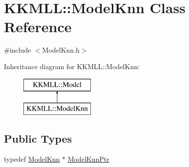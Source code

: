 \hypertarget{class_k_k_m_l_l_1_1_model_knn}{}\section{K\+K\+M\+LL\+:\+:Model\+Knn Class Reference}
\label{class_k_k_m_l_l_1_1_model_knn}


{\ttfamily \#include $<$Model\+Knn.\+h$>$}

Inheritance diagram for K\+K\+M\+LL\+:\+:Model\+Knn\+:\begin{figure}[H]
\begin{center}
\leavevmode
\includegraphics[height=2.000000cm]{class_k_k_m_l_l_1_1_model_knn}
\end{center}
\end{figure}
\subsection*{Public Types}
\begin{DoxyCompactItemize}
\item 
typedef \hyperlink{class_k_k_m_l_l_1_1_model_knn}{Model\+Knn} $\ast$ \hyperlink{class_k_k_m_l_l_1_1_model_knn_a1abfb9166a9e53ff6116716105876001}{Model\+Knn\+Ptr}
\end{DoxyCompactItemize}
